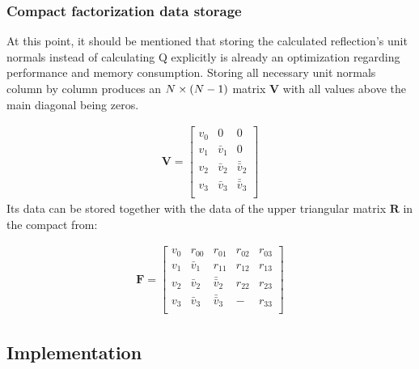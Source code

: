 
\subsubsection{Compact factorization data storage}
\label{sec:qrOptimizationsCompactData}

At this point, it should be mentioned that storing the calculated reflection's unit normals instead of calculating Q explicitly is already an optimization regarding performance and memory consumption.
Storing all necessary unit normals column by column produces an $N \times \left(N-1\right)$ matrix $\mathbf{V}$ with all values above the main diagonal being zeros.

\begin{align}
\mathbf{V} = 
\begin{bmatrix}
v_0 & 0         & 0\\
v_1 & \bar{v}_1 & 0\\
v_2 & \bar{v}_2 & \bar{\bar{v}}_2 \\
v_3 & \bar{v}_3 & \bar{\bar{v}}_3 \\
\end{bmatrix}
\end{align}
%
Its data can be stored together with the data of the upper triangular matrix $\mathbf{R}$ in the compact from:

\begin{align}
\mathbf{F} = 
\begin{bmatrix}
	v_0 & r_{00}    & r_{01}          & r_{02} & r_{03} \\
	v_1 & \bar{v}_1 & r_{11}          & r_{12} & r_{13} \\
	v_2 & \bar{v}_2 & \bar{\bar{v}}_2 & r_{22} & r_{23} \\
	v_3 & \bar{v}_3 & \bar{\bar{v}}_3 & -      & r_{33} \\
\end{bmatrix}
\end{align}




\subsection{Implementation}




